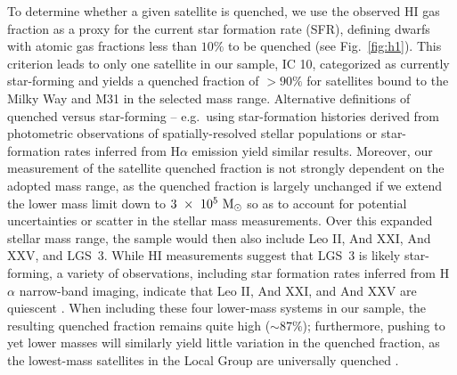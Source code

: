 To determine whether a given satellite is quenched, we use the
observed H{\scriptsize I} gas fraction as a proxy for the current star
formation rate (SFR), defining dwarfs with atomic gas fractions less
than $10\%$ to be quenched (see Fig.~\ref{fig:h1}). This criterion
leads to only one satellite in our sample, IC 10, categorized as
currently star-forming and yields a quenched fraction of $>90\%$ for
satellites bound to the Milky Way and M31 in the selected mass
range. 
%
Alternative definitions of quenched versus star-forming -- e.g.~using
star-formation histories derived from photometric observations of
spatially-resolved stellar populations \citep{weisz14a, weisz15} or
star-formation rates inferred from H$\alpha$ emission \citep{kaisin13,
  karachentsev13} yield similar results.
%
Moreover, our measurement of the satellite quenched fraction is not
strongly dependent on the adopted mass range, as the quenched fraction
is largely unchanged if we extend the lower mass limit down to
$3~\times~10^{5}~{\rm M}_{\odot}$ so as to account for potential uncertainties
or scatter in the stellar mass measurements.
%
Over this expanded stellar mass range, the sample would then also
include Leo II, And XXI, And XXV, and LGS~3. While H{\scriptsize I}
measurements suggest that LGS~3 is likely star-forming, a variety of
observations, including star formation rates inferred from H$\alpha$
narrow-band imaging, indicate that Leo II, And XXI, and And XXV are
quiescent \citep{grcevich09, kaisin12, kaisin13, spekkens14, weisz14a,
  weisz14b}. When including these four lower-mass systems in our
sample, the resulting quenched fraction remains quite
high %
($\sim87\%$); furthermore, pushing to yet lower masses will similarly
yield little variation in the quenched fraction, as the lowest-mass
satellites in the Local Group are universally quenched
\citep[e.g.][]{okamoto08, sand09, sand10, weisz14a, brown14}.



